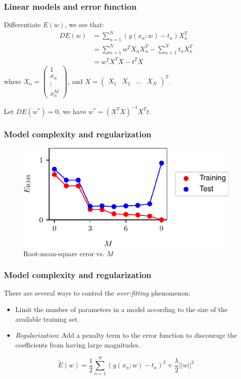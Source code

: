 \documentclass{beamer}
\begin{document}
\begin{frame}
    \frametitle{Linear models and error function}
    Differentiate $E(w)$, we see that:
    \begin{equation*}
        \begin{split}
            DE(w)&=\sum_{n=1}^{N}(y(x_{n};w)-t_{n})X_{n}^{T} \\
            &=\sum_{n=1}^{N}w^{T}X_{n}X_{n}^{T}-\sum_{n=1}^{N}t_{n}X_{n}^{T} \\
            &=w^{T}X^{T}X-t^{T}X
        \end{split}
    \end{equation*}
    where $X_{n}=\begin{pmatrix}
        1 \\
        x_{n} \\
        \vdots \\
        x_{n}^{M}
    \end{pmatrix}$, and $X=\begin{pmatrix}
        X_{1}&X_{2}&\hdots&X_{N}
    \end{pmatrix}^{T}$.
    
    Let $DE(w^{*})=0$, we have $w^{*}=(X^{T}X)^{-1}X^{T}t$.
\end{frame}

\begin{frame}
    \frametitle{Model complexity and regularization}
    \begin{figure}
        \caption{Root-mean-square error vs. $M$}
        \includegraphics{Figure_7.pdf}
    \end{figure}
\end{frame}

\begin{frame}
    \frametitle{Model complexity and regularization}
    There are several ways to control the \emph{over-fitting} phenomenon:
    \begin{itemize}
        \item Limit the number of parameters in a model according to the size of the available training set.
        \item \emph{Regularization}: Add a penalty term to the error function to discourage the coefficients from having large magnitudes.
    \end{itemize}
    \begin{equation*}
        \tilde{E}(w)=\frac{1}{2}\sum_{n=1}^{N}(y(x_{n};w)-t_{n})^{2}+\frac{\lambda}{2}||w||^{2}
    \end{equation*}
\end{frame}
\end{document}
